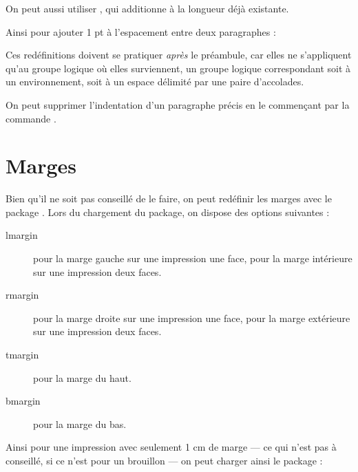 \begin{latexcode}
\setlength{\parindent}{3ex}
\end{latexcode}

On peut aussi utiliser , qui additionne  à la longueur déjà existante.

Ainsi pour ajouter 1 pt à l'espacement entre deux paragraphes :

\begin{latexcode}
\addtolength{\parskip}{1pt}
\end{latexcode}

Ces redéfinitions doivent se pratiquer \emph{après} le préambule, car elles ne s'appliquent qu'au groupe logique où elles surviennent, un groupe logique correspondant soit à un environnement, soit à un espace délimité par une paire d'accolades.

\begin{plusloins}
On peut supprimer l'indentation d'un paragraphe précis en le commençant par la commande .
\end{plusloins}

\section{Marges}

Bien qu'il ne soit pas conseillé de le faire, on peut redéfinir les marges avec le package . Lors du chargement du package, on dispose des options suivantes :
\begin{description}
\item[lmargin]pour la marge gauche sur une impression une face, pour la marge intérieure sur une impression deux faces.
\item[rmargin]pour la marge droite sur une impression une face, pour la marge extérieure sur une impression deux faces.
\item[tmargin]pour la marge du haut.
\item[bmargin]pour la marge du bas.
\end{description}

Ainsi pour une impression avec seulement 1 cm de marge --- ce qui n'est pas à conseillé, si ce n'est pour un brouillon --- on peut charger ainsi le package :

\begin{latexcode}
\usepackage[lmargin=1cm,rmargin=1cm,tmargin=1cm,bmargin=1cm]{geometry}
\end{latexcode}

